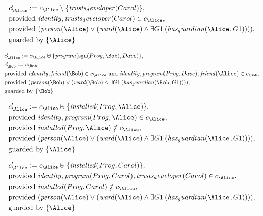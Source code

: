 \begin{align*}
&
c'_
{
\Alice
}
 := 
c_
{
\Alice
}
 \setminus 
\{
\mathit{
trusts_developer
}
(
Carol
)
\}
,\\
&
\text{provided } 
\mathit{
identity
}
,
\mathit{
trusts_developer
}
(
Carol
)
 \in c_
{
\Alice
}
,\\
&
\text{provided } 
(
\mathit{
person
}
(
\Alice
)
\lor
(
\mathit{
ward
}
(
\Alice
)
\land
\exists 
G1
\,(
\mathit{
has_guardian
}
(
\Alice
,
G1
)
)
)
)
,\\
&
\text{guarded by } \{
\Alice
\}
\end{align*}

\begin{align*}
&
c'_
{
\Alice
}
 := 
c_
{
\Alice
}
 \uplus 
\{
\mathit{
program
}
(
\mathrm{sgn}(
Prog
,
\Bob
)
,
Dave
)
\}
,\\
&
c'_
{
\Bob
}
 := 
c_
{
\Bob
}
,\\
&
\text{provided } 
\mathit{
identity
}
,
\mathit{
friend
}
(
\Bob
)
 \in c_
{
\Alice
}
 \text{ and } 
\mathit{
identity
}
,
\mathit{
program
}
(
Prog
,
Dave
)
,
\mathit{
friend
}
(
\Alice
)
 \in c_
{
\Bob
}
,\\
&
\text{provided } 
(
\mathit{
person
}
(
\Bob
)
\lor
(
\mathit{
ward
}
(
\Bob
)
\land
\exists 
G1
\,(
\mathit{
has_guardian
}
(
\Bob
,
G1
)
)
)
)
,\\
&
\text{guarded by } \{
\Bob
\}
\end{align*}

\begin{align*}
&
c'_
{
\Alice
}
 := 
c_
{
\Alice
}
 \uplus 
\{
\mathit{
installed
}
(
Prog
,
\Alice
)
\}
,\\
&
\text{provided } 
\mathit{
identity
}
,
\mathit{
program
}
(
Prog
,
\Alice
)
 \in c_
{
\Alice
}
,\\
&
\text{provided } 
\mathit{
installed
}
(
Prog
,
\Alice
)
 \notin c_
{
\Alice
}
,\\
&
\text{provided } 
(
\mathit{
person
}
(
\Alice
)
\lor
(
\mathit{
ward
}
(
\Alice
)
\land
\exists 
G1
\,(
\mathit{
has_guardian
}
(
\Alice
,
G1
)
)
)
)
,\\
&
\text{guarded by } \{
\Alice
\}
\end{align*}

\begin{align*}
&
c'_
{
\Alice
}
 := 
c_
{
\Alice
}
 \uplus 
\{
\mathit{
installed
}
(
Prog
,
Carol
)
\}
,\\
&
\text{provided } 
\mathit{
identity
}
,
\mathit{
program
}
(
Prog
,
Carol
)
,
\mathit{
trusts_developer
}
(
Carol
)
 \in c_
{
\Alice
}
,\\
&
\text{provided } 
\mathit{
installed
}
(
Prog
,
Carol
)
 \notin c_
{
\Alice
}
,\\
&
\text{provided } 
(
\mathit{
person
}
(
\Alice
)
\lor
(
\mathit{
ward
}
(
\Alice
)
\land
\exists 
G1
\,(
\mathit{
has_guardian
}
(
\Alice
,
G1
)
)
)
)
,\\
&
\text{guarded by } \{
\Alice
\}
\end{align*}
